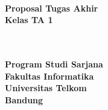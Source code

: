 {\centering
\large
{\bigsize\bf \Title}\\
\vspace{ 3cm}
\rm
\textbf{Proposal Tugas Akhir}\\
\vspace{0.25 cm}
\textbf{Kelas TA 1}\\
\vspace{0.25 cm}
 \textbf{\NIM}\\ \textbf{\Author}\\

\vspace{1.5 cm}

\begin{figure}[h]
{\par}
\end{figure}

\vspace{2 cm}
{\bigsize\textbf{Program Studi Sarjana \Prodi}\\
\vspace{0.25 cm}
\textbf{Fakultas Informatika}\\
\vspace{0.25 cm}
\textbf{Universitas Telkom}\\
\vspace{0.25 cm}
\textbf{Bandung}\\
\vspace{0.25 cm}
\textbf{\Date}\\}
}